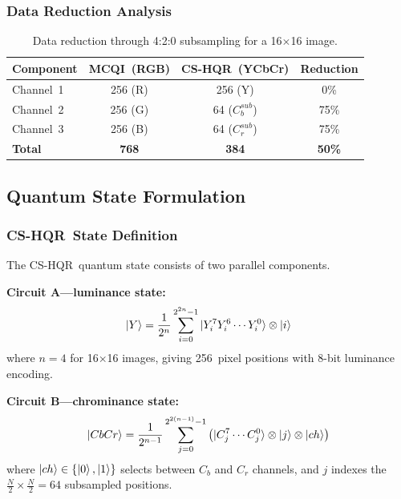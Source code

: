 \documentclass{ipol}
\newcommand{\cshqr}{\textsc{CS-HQR}}
\newcommand{\mcqi}{\textsc{MCQI}}
\begin{document}
\FloatBarrier
\subsubsection{Data Reduction Analysis}

\begin{table}[H]
\begin{center}
\begin{tabular}{lccc}
\hline
Component & \mcqi\ (RGB) & \cshqr\ (YCbCr) & Reduction \\
\hline
Channel~1 & 256 (R) & 256 (Y) & 0\% \\
Channel~2 & 256 (G) & 64 ($C_b^{sub}$) & 75\% \\
Channel~3 & 256 (B) & 64 ($C_r^{sub}$) & 75\% \\
\hline
\textbf{Total} & \textbf{768} & \textbf{384} & \textbf{50\%} \\
\hline
\end{tabular}
\caption{Data reduction through 4:2:0 subsampling for a 16$\times$16 image.}
\label{tab:data_reduction}
\end{center}
\end{table}

\FloatBarrier
\subsection{Quantum State Formulation}

\FloatBarrier
\subsubsection{\cshqr\ State Definition}

The \cshqr\ quantum state consists of two parallel components.

\textbf{Circuit A---luminance state:}
\begin{equation}
\ket{Y} = \frac{1}{2^n} \sum_{i=0}^{2^{2n}-1} \ket{Y_i^7 Y_i^6 \cdots Y_i^0}
  \otimes \ket{i}
\label{eq:luma_state}
\end{equation}
where $n = 4$ for 16$\times$16 images, giving 256~pixel positions with 8-bit
luminance encoding.

\textbf{Circuit B---chrominance state:}
\begin{equation}
\ket{CbCr} = \frac{1}{2^{n-1}} \sum_{j=0}^{2^{2(n-1)}-1} \left(
  \ket{C_j^7 \cdots C_j^0} \otimes \ket{j} \otimes \ket{ch} \right)
\label{eq:chroma_state}
\end{equation}
where $\ket{ch} \in \{\ket{0}, \ket{1}\}$ selects between $C_b$ and $C_r$
channels, and $j$ indexes the $\frac{N}{2} \times \frac{N}{2} = 64$
subsampled positions.
\end{document}
